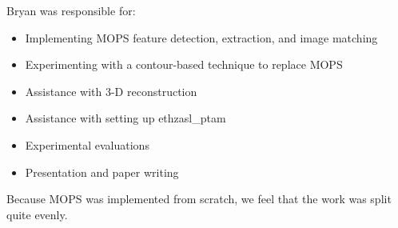 \documentclass{acmsiggraph}
\begin{document}
Bryan was responsible for:
\begin{itemize}
\item Implementing MOPS feature detection, extraction, and image matching
\item Experimenting with a contour-based technique to replace MOPS
\item Assistance with 3-D reconstruction
\item Assistance with setting up ethzasl\_ptam
\item Experimental evaluations
\item Presentation and paper writing
\end{itemize}

Because MOPS was implemented from scratch, we feel that the work was split quite evenly.



\end{document}
